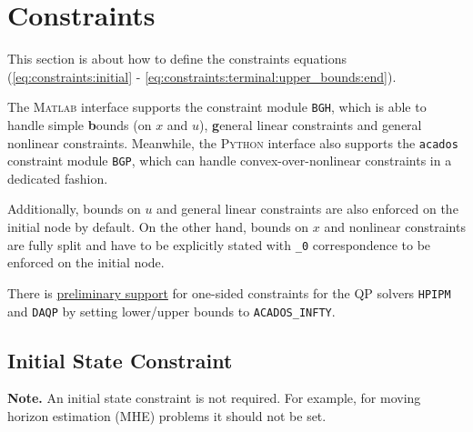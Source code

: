 \documentclass[english]{article}
\newcommand{\code}[1]{\texttt{#1}}
\newcommand{\str}[1]{\texttt{'#1'}}
\newcommand{\acados}{\texttt{acados}}
\newcommand{\matlab}{\textsc{Matlab}}
\newcommand{\python}{\textsc{Python}}
\begin{document}
\section{Constraints}\label{sec:constraints}
%
This section is about how to define the constraints equations (\ref{eq:constraints:initial} - \ref{eq:constraints:terminal:upper_bounds:end}).

The \matlab{} interface supports the constraint module \code{BGH}, which is able to handle simple \textbf{b}ounds (on $ x $ and $ u $), \textbf{g}eneral linear constraints and general nonlinear constraints.
Meanwhile, the \python{} interface also supports the \acados{} constraint module \code{BGP}, which can handle convex-over-nonlinear constraints in a dedicated fashion.

Additionally, bounds on $u$ and general linear constraints are also enforced on the initial node by default.
On the other hand, bounds on $x$ and nonlinear constraints are fully split and have to be explicitly stated with \code{\_0} correspondence to be enforced on the initial node.

There is \href{https://github.com/acados/acados/issues/650}{preliminary support} for one-sided constraints for the QP solvers \code{HPIPM} and \code{DAQP} by setting lower/upper bounds to \code{ACADOS\_INFTY}.


%
\subsection{Initial State Constraint}\label{sec:constraints:initial}
%
\textbf{Note.} An initial state constraint is not required.
For example, for moving horizon estimation (MHE) problems it should not be set.
\end{document}
